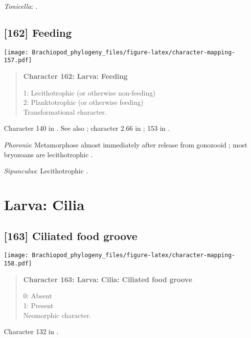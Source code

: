 \documentclass[openany]{book}
\theoremstyle{definition}
\theoremstyle{definition}
\theoremstyle{definition}
\theoremstyle{remark}
\begin{document}
\hypertarget{Tonicella-coding-161}{}
\emph{Tonicella}: \citet{Williams1997Introduction}.

\subsection*{{[}162{]} Feeding}\label{feeding}

\texttt{[image: Brachiopod\_phylogeny\_files/figure-latex/character-mapping-157.pdf]}

\begin{quote}
\textbf{Character 162: Larva: Feeding}

1: Lecithotrophic (or otherwise non-feeding)\\
2: Planktotrophic (or otherwise feeding)\\
Transformational character.
\end{quote}

Character 140 in \citet{Rouse1999}. See also \citet{Collin1997};
character 2.66 in \citet{SPS1996}; 153 in \citet{Giribet2002}.

\hypertarget{Phoronis-coding-162}{}
\emph{Phoronis}: Metamorphose almost immediately after release from
gonozooid \citep{Zimmer2013}; most bryozoans are lecithotrophic
\citep{Reed1982}.

\hypertarget{Sipunculus-coding-162}{}
\emph{Sipunculus}: Lecithotrophic \citep{Reed1982}.

\section{Larva: Cilia}\label{larva-cilia}

\subsection*{{[}163{]} Ciliated food groove}\label{ciliated-food-groove}

\texttt{[image: Brachiopod\_phylogeny\_files/figure-latex/character-mapping-158.pdf]}

\begin{quote}
\textbf{Character 163: Larva: Cilia: Ciliated food groove}

0: Absent\\
1: Present\\
Neomorphic character.
\end{quote}

Character 132 in \citet{Rouse1999}.
\end{document}
